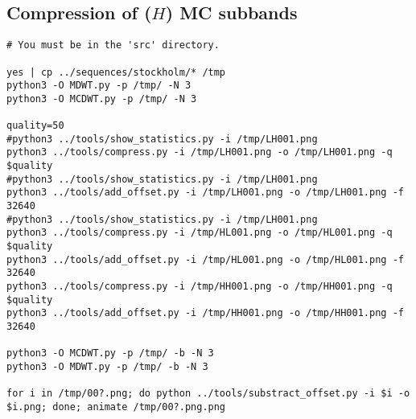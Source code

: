 \subsection*{Compression of ($H$) MC subbands}
\begin{verbatim}
# You must be in the 'src' directory.

yes | cp ../sequences/stockholm/* /tmp
python3 -O MDWT.py -p /tmp/ -N 3
python3 -O MCDWT.py -p /tmp/ -N 3

quality=50
#python3 ../tools/show_statistics.py -i /tmp/LH001.png
python3 ../tools/compress.py -i /tmp/LH001.png -o /tmp/LH001.png -q $quality
#python3 ../tools/show_statistics.py -i /tmp/LH001.png
python3 ../tools/add_offset.py -i /tmp/LH001.png -o /tmp/LH001.png -f 32640
#python3 ../tools/show_statistics.py -i /tmp/LH001.png
python3 ../tools/compress.py -i /tmp/HL001.png -o /tmp/HL001.png -q $quality
python3 ../tools/add_offset.py -i /tmp/HL001.png -o /tmp/HL001.png -f 32640
python3 ../tools/compress.py -i /tmp/HH001.png -o /tmp/HH001.png -q $quality
python3 ../tools/add_offset.py -i /tmp/HH001.png -o /tmp/HH001.png -f 32640

python3 -O MCDWT.py -p /tmp/ -b -N 3
python3 -O MDWT.py -p /tmp/ -b -N 3

for i in /tmp/00?.png; do python ../tools/substract_offset.py -i $i -o $i.png; done; animate /tmp/00?.png.png
\end{verbatim}

